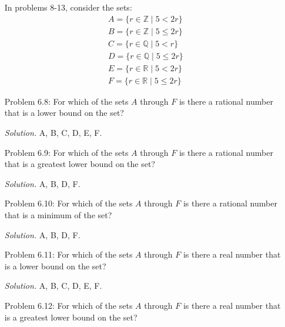 \documentclass{article}
\theoremstyle{claim}
\theoremstyle{definition}
\begin{document}
\begin{enumerate}
\begin{proof}
\begin{enumerate}
                    Assume $n = n_0$. Assume $\exists x_1, x_2, ..., x_n \in \mathbb{Q}$ so that for all $i = 1, 2, 3, ..., n$, we have $a < x_i < b$. Our inductive hypothesis says $\exists x_1, x_2, ..., x_{n_0} \in \mathbb{Q}$ so that for all $i = 1, 2, 3, ..., n$, we have $a < x_i < b$. Consider $a < x_{n_0} < b$. Since $x_{n_0} \in \mathbb{Q}$, it has to be in $\mathbb{R}$. So $x_{n_0} \in \mathbb{R}$. We also know $b \in \mathbb{R}$ and $b > x_{n_0}$ by our inductive hypothesis.
                    So then by the Density theorem, $\exists x_{n_0 + 1} \in \mathbb{Q}$ so that $x_{n_0} < x_{n_0 + 1} < b$. So then for all $i = 1, 2, ..., n_0, n_0 + 1$, we have $a < x_i < b$.
            \end{enumerate}
            Proving claim (1) and claim (2) thus completes the proof by induction on $n$.
        \end{proof}
    \item[] In problems 8-13, consider the sets:
    \begin{gather*}
        A = \{ r \in \mathbb{Z} \mid 5 < 2r\}\\
        B = \{ r \in \mathbb{Z} \mid 5 \le 2r\}\\
        C = \{ r \in \mathbb{Q} \mid 5 < r\}\\
        D = \{ r \in \mathbb{Q} \mid 5 \le 2r\}\\
        E = \{ r \in \mathbb{R} \mid 5 < 2r\}\\
        F = \{ r \in \mathbb{R} \mid 5 \le 2r\}
    \end{gather*}
    \item[Problem 6.8:] For which of the sets $A$ through $F$ is there a rational number that is a lower bound on the set?
    \item[] \emph{Solution. } A, B, C, D, E, F.
    \item[Problem 6.9:] For which of the sets $A$ through $F$ is there a rational number that is a greatest lower bound on the set?
    \item[] \emph{Solution. } A, B, D, F.
    \item[Problem 6.10:] For which of the sets $A$ through $F$ is there a rational number that is a minimum of the set?
    \item[] \emph{Solution. } A, B, D, F.
    \item[Problem 6.11:] For which of the sets $A$ through $F$ is there a real number that is a lower bound on the set?
    \item[] \emph{Solution. } A, B, C, D, E, F.
    \item[Problem 6.12:] For which of the sets $A$ through $F$ is there a real number that is a greatest lower bound on the set?

\end{enumerate}
\end{document}

